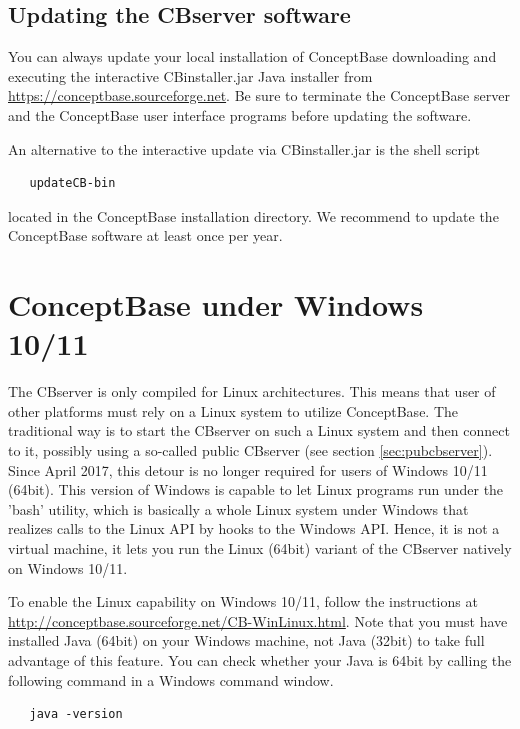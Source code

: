 \subsection{Updating the CBserver software}

You can always update your local installation of ConceptBase downloading and executing 
the interactive CBinstaller.jar Java installer from \url{https://conceptbase.sourceforge.net}.
Be sure to terminate the ConceptBase server and the ConceptBase user interface programs
before updating the software.

An alternative to the interactive update via CBinstaller.jar is the shell script

\begin{verbatim}
   updateCB-bin
\end{verbatim}

located in the ConceptBase installation directory. We recommend to update the ConceptBase software
at least once per year.


\section{ConceptBase under Windows 10/11}
\label{sec:win10}
The CBserver is only compiled for Linux architectures. This means that user of
other platforms must rely on a Linux system to utilize ConceptBase. The traditional
way is to start the CBserver on such a Linux system and then connect to it, possibly
using a so-called public CBserver (see section \ref{sec:pubcbserver}).
Since April 2017, this detour is no longer required for users of Windows 10/11 (64bit).
This version of Windows is capable to let Linux programs
run under the 'bash' utility, which is basically a whole Linux system under Windows
that realizes calls to the Linux API by hooks to the Windows API. Hence, it is not
a virtual machine, it lets you run the Linux (64bit) variant of the CBserver
natively on Windows 10/11.

To enable the Linux capability on Windows 10/11, follow the instructions at
\url{http://conceptbase.sourceforge.net/CB-WinLinux.html}. Note that you must have
installed Java (64bit) on your Windows machine, not Java (32bit) to take full advantage
of this feature. You can check whether your Java is 64bit by calling the following command
in a Windows command window.

\begin{verbatim}
   java -version
\end{verbatim}


